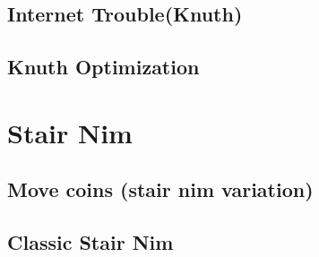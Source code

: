 \subsection{Internet Trouble(Knuth)}
\raggedbottom
\hrulefill
\subsection{Knuth Optimization}
\raggedbottom
\hrulefill

\section{Stair Nim}
\subsection{Move coins (stair nim variation)}
\raggedbottom
\hrulefill
\subsection{Classic Stair Nim}
\raggedbottom
\hrulefill

